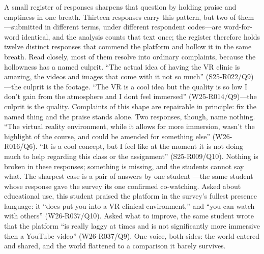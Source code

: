 A small register of responses sharpens that question by holding praise
and emptiness in one breath. Thirteen responses carry this pattern,
but two of them---submitted in different terms, under different
respondent codes---are word-for-word identical, and the analysis
counts that text once; the register therefore holds twelve distinct
responses that commend the platform and hollow it in the same breath. Read closely, most of them resolve
into ordinary complaints, because the hollowness has a named culprit.
``The actual idea of having the VR clinic is amazing, the videos and
images that come with it not so much'' (S25-R022/Q9)---the culprit is
the footage. ``The VR is a cool idea but the quality is so low I don't
gain from the atmosphere and I dont feel immersed'' (W25-R014/Q9)---the
culprit is the quality. Complaints of this shape are repairable in
principle: fix the named thing and the praise stands alone. Two
responses, though, name nothing. ``The virtual reality environment,
while it allows for more immersion, wasn't the highlight of the course,
and could be amended for something else'' (W26-R016/Q6). ``It is a cool
concept, but I feel like at the moment it is not doing much to help
regarding this class or the assignment'' (S25-R009/Q10). Nothing is
broken in these responses; something is missing, and the students
cannot say what. The sharpest case is a pair of answers by one student
---the same student whose response gave the survey its one confirmed
co-watching. Asked about educational use, this student praised the
platform in the survey's fullest presence language: it ``does put you
into a VR clinical environment,'' and ``you can watch with others''
(W26-R037/Q10). Asked what to improve, the same student wrote that the
platform ``is really laggy at times and is not significantly more
immersive then a YouTube video'' (W26-R037/Q9). One voice, both sides:
the world entered and shared, and the world flattened to a comparison
it barely survives.

